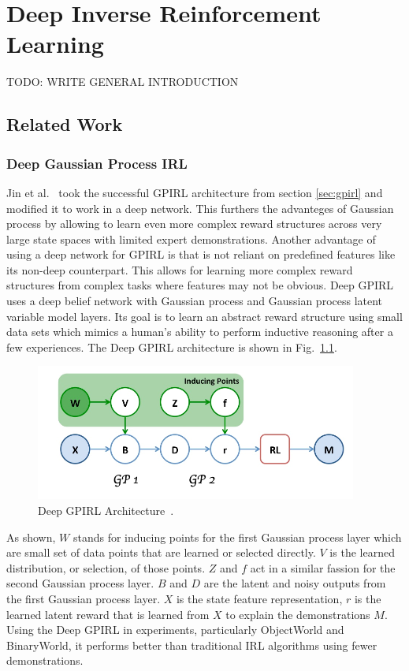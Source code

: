 \documentclass[12pt,american]{report}
\begin{document}
\chapter{Deep Inverse Reinforcement Learning}
TODO: WRITE GENERAL INTRODUCTION
\section{Related Work}
\subsection{Deep Gaussian Process IRL}
Jin et al.~\cite{jin2015inverse} took the successful GPIRL architecture from section \ref{sec:gpirl} and modified it to work in a deep network. This furthers the advanteges of Gaussian process by allowing to learn even more complex reward structures across very large state spaces with limited expert demonstrations. Another advantage of using a deep network for GPIRL is that is not reliant on predefined features like its non-deep counterpart.  This allows for learning more complex reward structures from complex tasks where features may not be obvious.  Deep GPIRL uses a deep belief network with Gaussian process and Gaussian process latent variable model layers. Its goal is to learn an abstract reward structure using small data sets which mimics a human's ability to perform inductive reasoning after a few experiences. The Deep GPIRL architecture is shown in Fig.~\ref{fig:dgpirl-arch}.
\begin{figure}
\centering
\includegraphics[scale=.85]{images/dgpirl-arch.png}
\caption{Deep GPIRL Architecture~\cite{jin2015inverse}.}
\label{fig:dgpirl-arch}
\end{figure}
 As shown, $W$ stands for inducing points for the first Gaussian process layer which are small set of data points that are learned or selected directly. $V$ is the learned distribution, or selection, of those points.  $Z$ and $f$ act in a similar fassion for the second Gaussian process layer. $B$ and $D$ are the latent and noisy outputs from the first Gaussian process layer. $X$ is the state feature representation, $r$ is the learned latent reward that is learned from $X$ to explain the demonstrations $M$.  Using the Deep GPIRL in experiments, particularly ObjectWorld and BinaryWorld, it performs better than traditional IRL algorithms using fewer demonstrations. 
\end{document}
